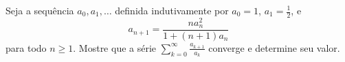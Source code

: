 Seja a sequência \(a_0,a_1,\dots\) definida indutivamente por \(a_0=1\), \(a_1=\frac{1}{2}\), e
\[a_{n+1}=\frac{n a_n^2}{1+(n+1)a_n}\]
para todo \(n \ge 1\).
Mostre que a série \(\sum_{k=0}^\infty \frac{a_{k+1}}{a_k}\) converge e determine seu valor.
